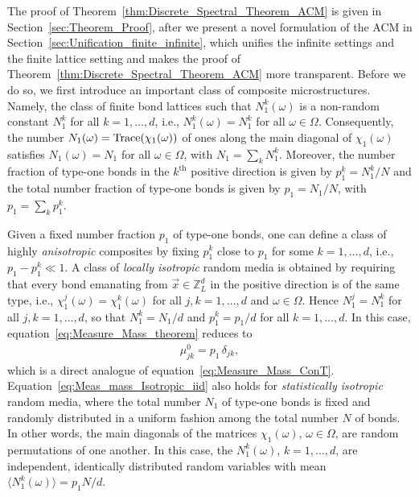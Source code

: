 \documentclass{cmslatex}
\begin{document}
The proof of Theorem~\ref{thm:Discrete_Spectral_Theorem_ACM} is given
in Section~\ref{sec:Theorem_Proof}, after we present a novel
formulation of the ACM in
Section~\ref{sec:Unification_finite_infinite}, which unifies the
infinite settings and the finite lattice setting and makes the proof of
Theorem~\ref{thm:Discrete_Spectral_Theorem_ACM} more
transparent. Before we do so, we first introduce an important class of
composite microstructures. Namely, the 
class of finite bond lattices such that $N_1^k(\omega)$ is a non-random
constant $N_1^k$ for all $k=1,\ldots,d$, i.e., $N_1^k(\omega)=N_1^k$ for all
$\omega\in\Omega$. Consequently, the number $N_1(\omega)={\rm Trace}(\chi_1(\omega))$ of ones
along the main diagonal of $\chi_1(\omega)$ satisfies $N_1(\omega)=N_1$ for all
$\omega\in\Omega$, with $N_1=\sum_kN_1^k$. Moreover, the number fraction of type-one
bonds in the $k^{\text{th}}$ positive direction is given by
$p_1^k=N_1^k/N$ and the total number fraction of type-one bonds is
given by $p_1=N_1/N$, with $p_1=\sum_kp_1^k$.





Given a fixed number
fraction $p_1$ of type-one  
bonds, one can define a class of highly \emph{anisotropic} composites
by fixing $p_1^k$ close to $p_1$ for some $k=1,\ldots,d$,
i.e., $p_1-p_1^k\ll1$. A class of \emph{locally isotropic} random media is 
obtained by requiring that every bond emanating from
$\vec{x}\in\mathbb{Z}^d_L$ in the positive direction is of the same
type, i.e., $\chi_1^j(\omega)=\chi_1^k(\omega)$ for all $j,k=1,\ldots,d$ and $\omega\in\Omega$. Hence
$N_1^j=N_1^k$ for all $j,k=1,\ldots,d$, so that $N_1^k=N_1/d$ and
$p_1^k=p_1/d$ for all $k=1,\ldots,d$. In this case,
equation~\eqref{eq:Measure_Mass_theorem} reduces to  
% 
\begin{align}\label{eq:Meas_mass_Isotropic_iid}
  \mu_{jk}^0=p_1\,\delta_{jk},
\end{align}
%
which is a direct analogue of equation~\eqref{eq:Measure_Mass_ConT}.
Equation~\eqref{eq:Meas_mass_Isotropic_iid} also holds for
\emph{statistically isotropic} random media, where the total number
$N_1$ of type-one bonds is fixed and randomly distributed in a uniform
fashion among the total number $N$ of bonds. In other words, the 
main diagonals of the matrices $\chi_1(\omega)$, $\omega\in\Omega$, are random
permutations of one another.  In this case, the
$N_1^k(\omega)$, $k=1,\ldots,d$, are independent, identically distributed random
variables with mean $\langle N_1^k(\omega)\rangle=p_1N/d$.
\end{document}
